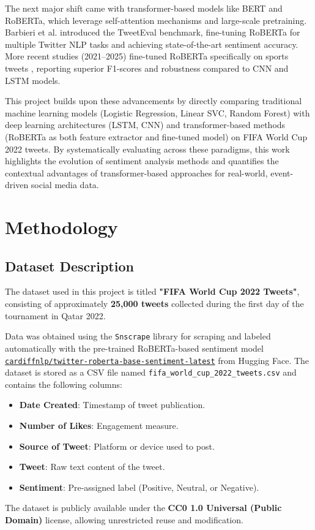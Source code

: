 \documentclass[10pt]{article}
\begin{document}
The next major shift came with transformer-based models like BERT and RoBERTa, which leverage self-attention mechanisms and large-scale pretraining. Barbieri et al. \cite{ref3} introduced the TweetEval benchmark, fine-tuning RoBERTa for multiple Twitter NLP tasks and achieving state-of-the-art sentiment accuracy. More recent studies (2021–2025) fine-tuned RoBERTa specifically on sports tweets \cite{ref4}, reporting superior F1-scores and robustness compared to CNN and LSTM models.

This project builds upon these advancements by directly comparing traditional machine learning models (Logistic Regression, Linear SVC, Random Forest) with deep learning architectures (LSTM, CNN) and transformer-based methods (RoBERTa as both feature extractor and fine-tuned model) on FIFA World Cup 2022 tweets. By systematically evaluating across these paradigms, this work highlights the evolution of sentiment analysis methods and quantifies the contextual advantages of transformer-based approaches for real-world, event-driven social media data.
\section{Methodology}

\subsection{Dataset Description}
The dataset used in this project is titled \textbf{"FIFA World Cup 2022 Tweets"}, consisting of approximately \textbf{25,000 tweets} collected during the first day of the tournament in Qatar 2022.

Data was obtained using the \texttt{Snscrape} library for scraping and labeled automatically with the pre-trained RoBERTa-based sentiment model
\href{https://huggingface.co/cardiffnlp/twitter-roberta-base-sentiment-latest}{\texttt{cardiffnlp/twitter-roberta-base-sentiment-latest}} from Hugging Face.
The dataset is stored as a CSV file named \texttt{fifa\_world\_cup\_2022\_tweets.csv} and contains the following columns:
\begin{itemize}
    \item \textbf{Date Created}: Timestamp of tweet publication.
    \item \textbf{Number of Likes}: Engagement measure.
    \item \textbf{Source of Tweet}: Platform or device used to post.
    \item \textbf{Tweet}: Raw text content of the tweet.
    \item \textbf{Sentiment}: Pre-assigned label (Positive, Neutral, or Negative).
\end{itemize}
The dataset is publicly available under the \textbf{CC0 1.0 Universal (Public Domain)} license, allowing unrestricted reuse and modification.
\end{document}
